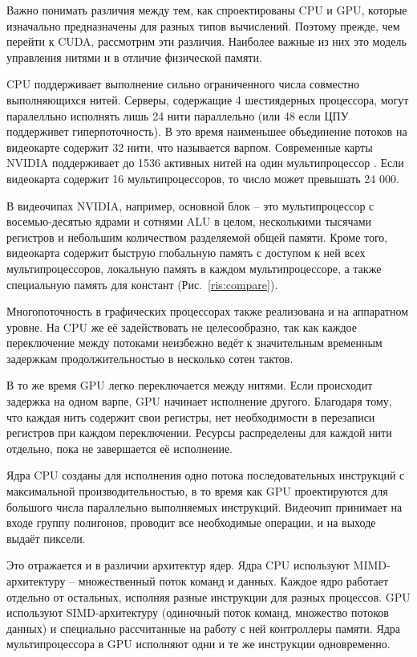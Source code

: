 \documentclass[a4paper,14pt,russian]{extreport}
\begin{document}
Важно понимать различия между тем, как спроектированы CPU и GPU, которые изначально предназначены для разных типов вычислений. Поэтому прежде, чем перейти к CUDA, рассмотрим эти различия. Наиболее важные из них это модель управления нитями и в отличие физической памяти.
\par CPU поддерживает выполнение сильно ограниченного числа совместно выполняющихся нитей. Серверы, содержащие 4 шестиядерных процессора, могут паралелльно исполнять лишь 24 нити параллельно (или 48 если ЦПУ поддерживет гиперпоточность). В это время наименьшее объединение потоков на видеокарте содержит 32 нити, что называется варпом. Современные карты NVIDIA поддерживает до 1536 активных нитей на один мультипроцессор \cite{features}. Если видеокарта содержит 16 мультипроцессоров, то число может превышать 24 000. 
\par В видеочипах NVIDIA, например, основной блок – это мультипроцессор с восемью-десятью ядрами и сотнями ALU в целом, несколькими тысячами регистров и небольшим количеством разделяемой общей памяти. Кроме того, видеокарта содержит быструю глобальную память с доступом к ней всех мультипроцессоров, локальную память в каждом мультипроцессоре, а также специальную память для констант (Рис.~\ref{ris:compare}).
\par Многопоточность в графических процессорах также реализована и на аппаратном уровне. На CPU же её задействовать не целесообразно, так как каждое переключение между потоками неизбежно ведёт к значительным временным задержкам продолжительностью в несколько сотен тактов. 
\par В то же время GPU легко переключается между нитями. Если происходит задержка на одном варпе, GPU начинает исполнение другого. Благодаря тому, что каждая нить содержит свои регистры, нет необходимости в перезаписи регистров при каждом переключении. Ресурсы распределены для каждой нити отдельно, пока не завершается её исполнение. 
\par Ядра CPU созданы для исполнения одно потока последовательных инструкций с максимальной производительностью, в то время как GPU проектируются для большого числа параллельно выполняемых инструкций. Видеочип принимает на входе группу полигонов, проводит все необходимые операции, и на выходе выдаёт пиксели.
\par Это отражается и в различии архитектур ядер. Ядра CPU используют MIMD-архитектуру – множественный поток команд и данных. Каждое ядро работает отдельно от остальных, исполняя разные инструкции для разных процессов. GPU используют SIMD-архитектуру (одиночный поток команд, множество потоков данных) и специально рассчитанные на работу с ней контроллеры памяти. Ядра мультипроцессора в GPU исполняют одни и те же инструкции одновременно. 
\end{document}
